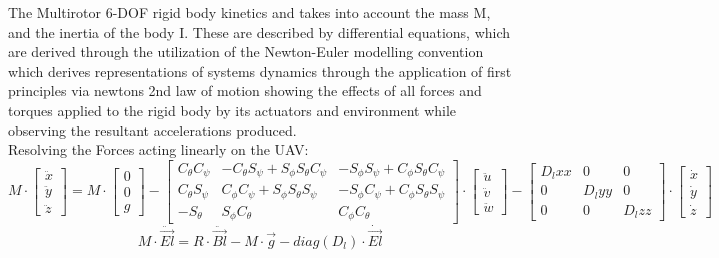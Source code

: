 \documentclass[12pt,a4paper,twoside]{report}
\begin{document}
					The Multirotor 6-DOF rigid body kinetics and takes into account the mass M, and the inertia of the body I. These are described by differential equations, which are derived through the utilization of the Newton-Euler modelling convention which derives representations of systems dynamics through the application of first principles via newtons 2nd law of motion showing the effects of all forces and torques applied to the rigid body by its actuators and environment while observing the resultant accelerations produced.
					\\
					Resolving the Forces acting linearly on the UAV:
					\\
					$$ 
					M 
					\cdot 
					\begin{bmatrix}
						\ddot{x} \\
						\ddot{y} \\
						\ddot{z}
					\end{bmatrix}
					=
					M 
					\cdot
					\begin{bmatrix}
						0 \\
						0 \\
						g
					\end{bmatrix}
					-
					\begin{bmatrix}
						C_\theta C_\psi & -C_\theta S_\psi + S_\phi S_\theta C_\psi & -S_\phi S_\psi + C_\phi S_\theta C_\psi \\
						C_\theta S_\psi &  C_\phi C_\psi + S_\phi S_\theta S_\psi   & -S_\phi C_\psi + C_\phi S_\theta S_\psi \\
						-S_\theta       &  S_\phi C_\theta                          &  C_\phi C_\theta
					\end{bmatrix}
					\cdot
					\begin{bmatrix}
						\ddot{u} \\
						\ddot{v} \\
						\ddot{w} 
					\end{bmatrix}
					-
					\begin{bmatrix}
						D_lxx & 0 & 0 \\
						0 & D_lyy & 0 \\
						0 & 0 & D_lzz
					\end{bmatrix}
					\cdot
					\begin{bmatrix}
						\dot{x} \\
						\dot{y} \\
						\dot{z} 
					\end{bmatrix}
					$$ 
					\[ M \cdot \ddot{\vec{El}} = R \cdot \ddot{\vec{Bl}} - M \cdot \vec{g} - diag(D_l) \cdot \dot{\vec{El}}\] 
\end{document}

